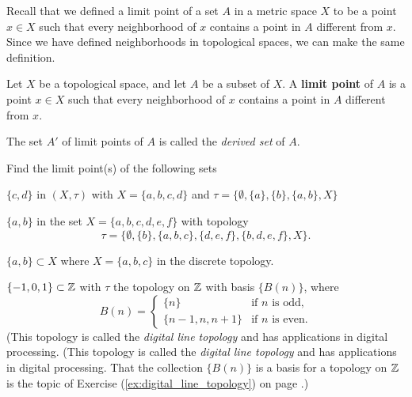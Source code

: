 \begin{comment}

\ActivitySolution

\ba

\item If $C$ is closed, then $C$ is the complement of some open set $O$. That is, $C = \Z \setminus O$ is finite. 

\item Since $\bigcup_{n \geq 3} C_n = \{n \in \Z \mid n \geq 2\}$ is an infinite set, we can see that the union of all of the $C_n$ is not a closed set in $(\Z, \tau_{FC})$. We conclude that arbitrary unions of closed sets need not be closed. 

\ea

\end{comment}


Recall that we defined a limit point of a set $A$ in a metric space $X$ to be a point $x \in X$ such that every neighborhood of $x$ contains a point in $A$ different from $x$. Since we have defined neighborhoods in topological spaces, we can make the same definition. 

\begin{definition} Let $X$ be a topological space, and let $A$ be a subset of $X$. A \textbf{limit point} of $A$ is a point $x \in X$ such that every neighborhood of $x$ contains a point in $A$ different from $x$. 
\end{definition}

The set $A'$ of limit points of $A$ is called the \emph{derived set} of $A$. 

\begin{activity} Find the limit point(s) of the following sets
\ba
\item $\{c,d\}$ in $(X, \tau)$ with $X= \{a,b,c,d\}$ and $\tau = \{\emptyset, \{a\}, \{b\}, \{a,b\}, X \}$

\item $\{a,b\}$ in the set $X= \{a,b,c,d,e,f\}$ with topology 
\[\tau= \{\emptyset,\{b\}, \{a,b,c\},\{d,e,f\},\{b,d,e,f\}, X\}.\] 

\item $\{a,b\} \subset X$ where $X = \{a,b,c\}$ in the discrete topology. 

\item $\{-1,0,1\} \subset \mathbb{Z}$ with $\tau$ the topology on $\mathbb{Z}$ with basis $\{B(n)\}$, where 
\[B(n) = \begin{cases} \{n\}	&\text{if $n$ is odd}, \\ \{n-1,n,n+1\}	&\text{if $n$ is even}. \end{cases}\]
(This topology is called the \emph{digital line topology} and has applications in digital processing. (This topology is called the \emph{digital line topology} and has applications in digital processing. That the collection $\{B(n)\}$ is a basis for a topology on $\mathbb{Z}$ is the topic of Exercise (\ref{ex:digital_line_topology}) on page \pageref{ex:digital_line_topology}.)
 
 \ea

\end{activity}

